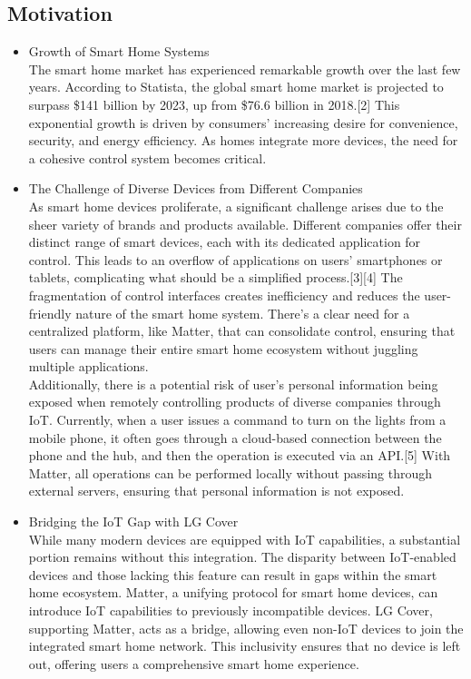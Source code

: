 \documentclass[conference]{IEEEtran}
\begin{document}
\subsection{\large{Motivation}}
\begin{itemize}
\item Growth of Smart Home Systems\\
The smart home market has experienced remarkable growth over the last few years. According to Statista, the global smart home market is projected to surpass \$141 billion by 2023, up from \$76.6 billion in 2018.[2] This exponential growth is driven by consumers' increasing desire for convenience, security, and energy efficiency. As homes integrate more devices, the need for a cohesive control system becomes critical.\\
\item The Challenge of Diverse Devices from Different Companies \\
As smart home devices proliferate, a significant challenge arises due to the sheer variety of brands and products available. Different companies offer their distinct range of smart devices, each with its dedicated application for control. This leads to an overflow of applications on users' smartphones or tablets, complicating what should be a simplified process.[3][4] The fragmentation of control interfaces creates inefficiency and reduces the user-friendly nature of the smart home system. There's a clear need for a centralized platform, like Matter, that can consolidate control, ensuring that users can manage their entire smart home ecosystem without juggling multiple applications. \\
Additionally, there is a potential risk of user's personal information being exposed when remotely controlling products of diverse companies through IoT. Currently, when a user issues a command to turn on the lights from a mobile phone, it often goes through a cloud-based connection between the phone and the hub, and then the operation is executed via an API.[5] With Matter, all operations can be performed locally without passing through external servers, ensuring that personal information is not exposed.\\
\item Bridging the IoT Gap with LG Cover\\
While many modern devices are equipped with IoT capabilities, a substantial portion remains without this integration. The disparity between IoT-enabled devices and those lacking this feature can result in gaps within the smart home ecosystem. Matter, a unifying protocol for smart home devices, can introduce IoT capabilities to previously incompatible devices. LG Cover, supporting Matter, acts as a bridge, allowing even non-IoT devices to join the integrated smart home network. This inclusivity ensures that no device is left out, offering users a comprehensive smart home experience.\\
\end{itemize}
\end{document}
